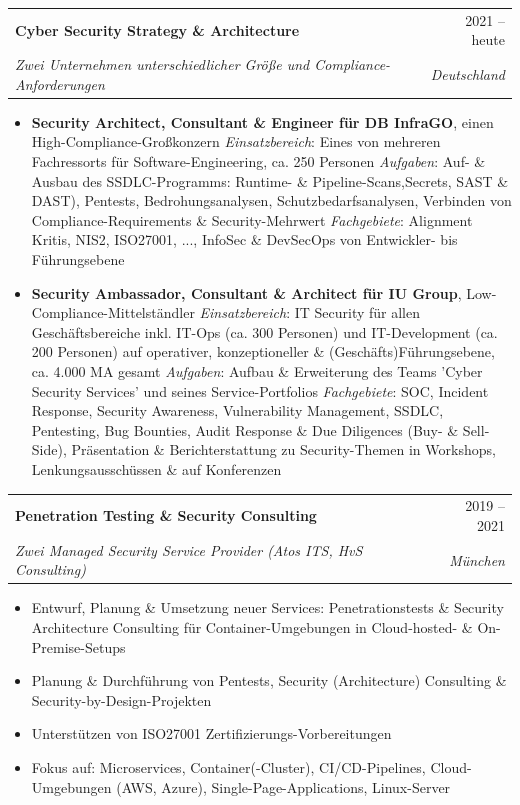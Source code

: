 \documentclass[letterpaper,11pt]{article}
\makeatletter
\newcommand{\resumeItemWithoutHeadline}[1]{
	\item\small{
		{#1 \vspace{-2pt}}
	}
}
\newcommand{\resumeSubheading}[4]{
  \vspace{-1pt}\item
    \begin{tabular*}{0.97\textwidth}[t]{l@{\extracolsep{\fill}}r}
      \textbf{#1} & #2 \\
      \textit{\small#3} & \textit{\small #4} \\
    \end{tabular*}\vspace{-5pt}
}
\newcommand{\resumeItemListStart}{\begin{itemize}}
\newcommand{\resumeItemListEnd}{\end{itemize}\vspace{-5pt}}
\makeatother
\begin{document}
	\resumeSubheading
	{Cyber Security Strategy \& Architecture}{2021 -- heute}
  	{Zwei Unternehmen unterschiedlicher Größe und Compliance-Anforderungen}{Deutschland}
    \resumeItemListStart 
    		\resumeItemWithoutHeadline {
    			\textbf{Security Architect, Consultant \& Engineer für DB InfraGO}, einen High-Compliance-Großkonzern\linebreak
    			\textit{Einsatzbereich}: Eines von mehreren Fachressorts für Software-Engineering, ca. 250 Personen \linebreak
			\textit{Aufgaben}: Auf- \& Ausbau des SSDLC-Programms: Runtime- \& Pipeline-Scans,Secrets, SAST \& DAST), Pentests, Bedrohungsanalysen, Schutzbedarfsanalysen, Verbinden von Compliance-Requirements \& Security-Mehrwert \linebreak		
    			\textit{Fachgebiete}: Alignment Kritis, NIS2, ISO27001, ..., InfoSec \& DevSecOps von Entwickler- bis Führungsebene}
    		\resumeItemWithoutHeadline{
    			\textbf{Security Ambassador, Consultant \& Architect für IU Group}, Low-Compliance-Mittelständler\linebreak
    			\textit{Einsatzbereich}: IT Security für allen Geschäftsbereiche inkl. IT-Ops (ca. 300 Personen) und IT-Development (ca. 200 Personen) auf operativer, konzeptioneller \& (Geschäfts)Führungsebene, ca. 4.000 MA gesamt \linebreak
    			\textit{Aufgaben}: Aufbau \& Erweiterung des Teams 'Cyber Security Services' und seines Service-Portfolios  \linebreak
    			\textit{Fachgebiete}: SOC, Incident Response, Security Awareness, Vulnerability Management, SSDLC, Pentesting, \linebreak
    			Bug Bounties, Audit Response \& Due Diligences (Buy- \& Sell-Side), \linebreak
    			Präsentation \& Berichterstattung zu Security-Themen in Workshops, Lenkungsausschüssen \& auf Konferenzen
    		}
	\resumeItemListEnd  	

	\resumeSubheading
	{Penetration Testing \& Security Consulting}{2019 -- 2021}
  	{Zwei Managed Security Service Provider (Atos ITS, HvS Consulting)}{München}
  	\resumeItemListStart
		\resumeItemWithoutHeadline
       	{Entwurf, Planung \& Umsetzung neuer Services: Penetrationstests \& Security Architecture Consulting \linebreak
       	für Container-Umgebungen in Cloud-hosted- \& On-Premise-Setups}
		\resumeItemWithoutHeadline
        {Planung \& Durchführung von Pentests, Security (Architecture) Consulting \& Security-by-Design-Projekten}
		\resumeItemWithoutHeadline
		{Unterstützen von ISO27001 Zertifizierungs-Vorbereitungen}
		\resumeItemWithoutHeadline
		{Fokus auf: Microservices, Container(-Cluster), CI/CD-Pipelines, Cloud-Umgebungen (AWS, Azure), Single-Page-Applications, Linux-Server}
	\resumeItemListEnd
	
\end{document}
